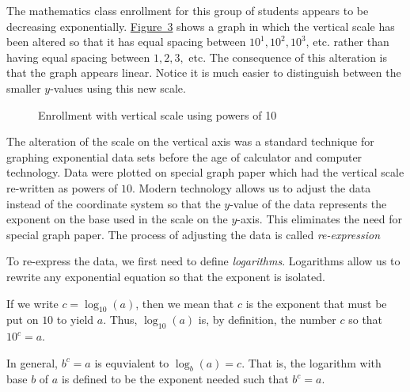 \documentclass[10pt,]{book}
\theoremstyle{ptxdefinitionnotitle}
\theoremstyle{ptxdefinitiontitle}
\theoremstyle{ptxdefinitionnotitle}
\theoremstyle{ptxdefinitiontitle}
\theoremstyle{ptxdefinitionnotitle}
\theoremstyle{ptxdefinitiontitle}
\numberwithin{equation}{section}
\begin{document}
\hypertarget{p-274}{}%
The mathematics class enrollment for this group of students appears to be decreasing exponentially. \hyperref[plot-math-enrollment-log1]{Figure~3} shows a graph in which the vertical scale has been altered so that it has equal spacing between \(10^1, 10^2, 10^3\), etc. rather than having equal spacing between \(1, 2, 3,\) etc.  The consequence of this alteration is that the graph appears linear. Notice it is much easier to distinguish between the smaller \(y\)-values using this new scale.%
\begin{figure}
\centering
{
}
\caption{Enrollment with vertical scale using powers of 10\label{plot-math-enrollment-log1}}
\end{figure}
\hypertarget{p-275}{}%
The alteration of the scale on the vertical axis was a standard technique for graphing exponential data sets before the age of calculator and computer technology. Data were plotted on special graph paper which had the vertical scale re-written as powers of \(10\). Modern technology allows us to adjust the data instead of the coordinate system so that the \(y\)-value of the data represents the exponent on the base used in the scale on the \(y\)-axis. This eliminates the need for special graph paper. The process of adjusting the data is called \emph{re-expression}%
\par
\hypertarget{p-276}{}%
To re-express the data, we first need to define \emph{logarithms}. Logarithms allow us to rewrite any exponential equation so that the exponent is isolated.%
\par
\hypertarget{p-277}{}%
If we write  \(c = \log_{10}(a)\), then we mean that \(c\) is the exponent that must be put on \(10\) to yield \(a\). Thus, \(\log_{10}(a)\) is, by definition, the number \(c\) so that \(10^c = a.\)%
\par
\hypertarget{p-278}{}%
In general, \(b ^ c = a\) is equvialent to \(\log_b(a) = c\). That is, the logarithm with base \(b\) of \(a\) is defined to be the exponent needed such that \(b ^ c = a\).%
\end{document}
